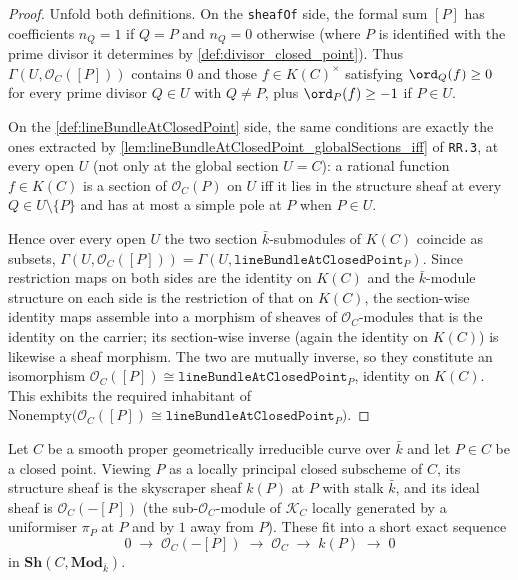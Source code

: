 \begin{proof}
  Unfold both definitions. On the \texttt{sheafOf} side, the formal sum
  \([P]\) has coefficients \(n_Q = 1\) if \(Q = P\) and \(n_Q = 0\) otherwise
  (where \(P\) is identified with the prime divisor it determines by
  \cref{def:divisor_closed_point}). Thus
  \(\Gamma(U, \mathcal O_C([P]))\) contains \(0\) and those
  \(f \in K(C)^{\times}\) satisfying \(\ord_Q(f) \geq 0\) for every prime
  divisor \(Q \in U\) with \(Q \neq P\), plus \(\ord_P(f) \geq -1\) if
  \(P \in U\).

  On the \cref{def:lineBundleAtClosedPoint} side, the same conditions
  are exactly the ones extracted by
  \cref{lem:lineBundleAtClosedPoint_globalSections_iff} of
  \texttt{RR.3}, at every open \(U\) (not only at the global section
  \(U = C\)): a rational function \(f \in K(C)\) is a section of
  \(\mathcal O_C(P)\) on \(U\) iff it lies in the structure sheaf at every
  \(Q \in U \setminus \{P\}\) and has at most a simple pole at \(P\) when
  \(P \in U\).

  Hence over every open \(U\) the two section \(\bar k\)-submodules of
  \(K(C)\) coincide as subsets,
  \(\Gamma(U, \mathcal O_C([P])) = \Gamma(U, \texttt{lineBundleAtClosedPoint}_P)\).
  Since restriction maps on both sides are the identity on \(K(C)\) and the
  \(\bar k\)-module structure on each side is the restriction of that on
  \(K(C)\), the section-wise identity maps assemble into a morphism of
  sheaves of \(\mathcal O_C\)-modules that is the identity on the carrier;
  its section-wise inverse (again the identity on \(K(C)\)) is likewise a
  sheaf morphism. The two are mutually inverse, so they constitute an
  isomorphism \(\mathcal O_C([P]) \cong \texttt{lineBundleAtClosedPoint}_P\),
  identity on \(K(C)\). This exhibits the required inhabitant of
  \(\mathrm{Nonempty}\bigl(\mathcal O_C([P]) \cong
  \texttt{lineBundleAtClosedPoint}_P\bigr)\).
\end{proof}

\begin{lemma}
  \label{lem:idealSheaf_ses_closedPoint}
  Let \(C\) be a smooth proper geometrically irreducible curve over
  \(\bar k\) and let \(P \in C\) be a closed point. Viewing \(P\) as a
  locally principal closed subscheme of \(C\), its structure sheaf is the
  skyscraper sheaf \(k(P)\) at \(P\) with stalk \(\bar k\), and its ideal
  sheaf is \(\mathcal O_C(-[P])\) (the sub-\(\mathcal O_C\)-module of
  \(\mathcal K_C\) locally generated by a uniformiser \(\pi_P\) at \(P\) and
  by \(1\) away from \(P\)). These fit into a short exact sequence
  \[
    0 \;\longrightarrow\; \mathcal O_C(-[P])
    \;\longrightarrow\; \mathcal O_C
    \;\longrightarrow\; k(P)
    \;\longrightarrow\; 0
  \]
  in \(\mathbf{Sh}(C, \mathbf{Mod}_{\bar k})\).
\end{lemma}

